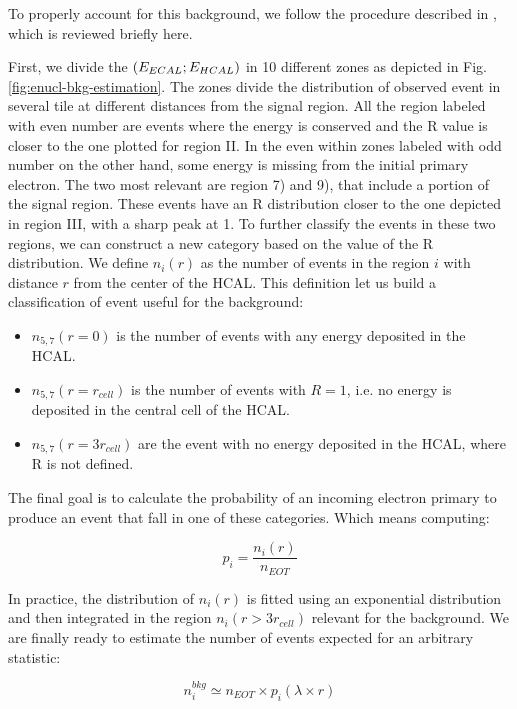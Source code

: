 To properly account for this background, we follow the procedure described in \cite{na64-neutrals-study,pdegen-thesis}, which is reviewed briefly here.

First, we divide the $(E_{ECAL};E_{HCAL})$ in 10 different zones as depicted in Fig.\ref{fig:enucl-bkg-estimation}. The zones divide the distribution of observed event in several tile at different distances from the signal region. All the region labeled with even number are events where the energy is conserved and the R value is closer to the one plotted for region II. In the even within zones labeled with odd number on the other hand, some energy is missing from the initial primary electron. The two most relevant are region 7) and 9), that include a portion of the signal region. These events have an R distribution closer to the one depicted in region III, with a sharp peak at 1. To further classify the events in these two regions, we can construct a new category based on the value of the R distribution. We define $n_i(r)$ as the number of events in the region $i$ with distance $r$ from the center of the HCAL. This definition let us build a classification of event useful for the background:

\begin{itemize}
\item $n_{5,7}(r=0)$ is the number of events with any energy deposited in the HCAL.
\item $n_{5,7}(r=r_{cell})$ is the number of events with $R=1$, i.e. no energy is deposited in the central cell of the HCAL.
\item $n_{5,7}(r=3r_{cell})$ are the event with no energy deposited in the HCAL, where R is not defined.
\end{itemize}

The final goal is to calculate the probability of an incoming electron primary to produce an event that fall in one of these categories. Which means computing:

\begin{equation}
  \label{eq:enucl-prob}
  p_i = \frac{n_i(r)}{n_{EOT}}
\end{equation}

In practice, the distribution of $n_{i}(r)$ is fitted using an exponential distribution and then integrated in the region $n_i(r>3r_{cell})$ relevant for the background. We are finally ready to estimate the number of events expected for an arbitrary statistic:

\begin{equation}
  \label{eq:exp-bkg-inv-2021}
  n^{bkg}_i \simeq n_{EOT} \times p_i(\lambda \times r)
\end{equation}

